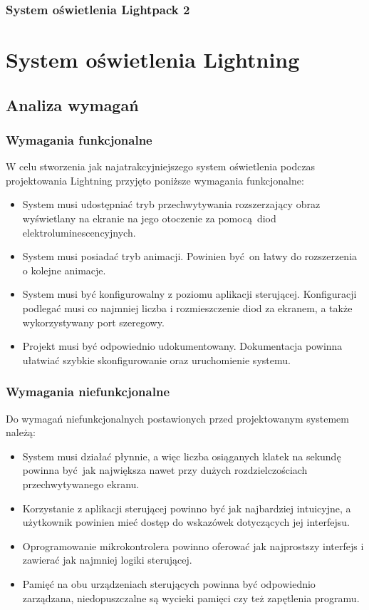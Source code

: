 \documentclass[12pt]{report}
\begin{document}
\subsection{System oświetlenia Lightpack 2}


\chapter{System oświetlenia Lightning}

\section{Analiza wymagań}

\subsection{Wymagania funkcjonalne}

W celu stworzenia jak najatrakcyjniejszego system oświetlenia podczas projektowania Lightning przyjęto poniższe wymagania funkcjonalne:

\begin{itemize}
\item System musi udostępniać tryb przechwytywania rozszerzający obraz wyświetlany na ekranie na jego otoczenie za pomocą diod elektroluminescencyjnych.
\item System musi posiadać tryb animacji. Powinien być on łatwy do rozszerzenia o kolejne animacje.
\item System musi być konfigurowalny z poziomu aplikacji sterującej. Konfiguracji podlegać musi co najmniej liczba i rozmieszczenie diod za ekranem, a także wykorzystywany port szeregowy.
\item Projekt musi być odpowiednio udokumentowany. Dokumentacja powinna ułatwiać szybkie skonfigurowanie oraz uruchomienie systemu.
\end{itemize}

\subsection{Wymagania niefunkcjonalne}

Do wymagań niefunkcjonalnych postawionych przed projektowanym systemem należą:

\begin{itemize}
\item System musi działać płynnie, a więc liczba osiąganych klatek na sekundę powinna być jak największa nawet przy dużych rozdzielczościach przechwytywanego ekranu.
\item Korzystanie z aplikacji sterującej powinno być jak najbardziej intuicyjne, a użytkownik powinien mieć dostęp do wskazówek dotyczących jej interfejsu.
\item Oprogramowanie mikrokontrolera powinno oferować jak najprostszy interfejs i zawierać jak najmniej logiki sterującej.
\item Pamięć na obu urządzeniach sterujących powinna być odpowiednio zarządzana, niedopuszczalne są wycieki pamięci czy też zapętlenia programu.
\end{itemize}
\end{document}
